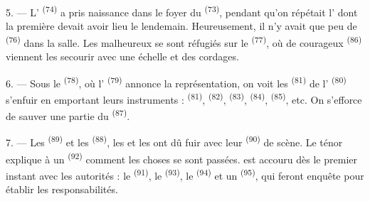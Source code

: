 \VUsaut{5.0mm}
\VUsaut{3.4mm}

5. --- L' \textsuperscript{(74)} a pris naissance dans le foyer
du  \textsuperscript{(73)}, pendant qu'on répétait
l' dont la première  devait avoir lieu le
lendemain. Heureusement, il n'y avait que peu de 
\textsuperscript{(76)} dans la salle. Les malheureux se sont réfugiés sur le
 \textsuperscript{(77)}, où de courageux 
\textsuperscript{(86)} viennent les secourir avec une échelle et des cordages.

6. --- Sous le  \textsuperscript{(78)}, où l'
\textsuperscript{(79)} annonce la représentation, on voit les
 \textsuperscript{(81)} de l'
\textsuperscript{(80)} s'enfuir en emportant leurs instruments :
 \textsuperscript{(81)},  \textsuperscript{(82)},
 \textsuperscript{(83)}, 
\textsuperscript{(84)},  \textsuperscript{(85)}, etc. On
s'efforce de sauver une partie du  \textsuperscript{(87)}.

7. --- Les  \textsuperscript{(89)} et les 
\textsuperscript{(88)}, les  et les  ont dû
fuir avec leur  \textsuperscript{(90)} de scène. Le ténor
explique à un  \textsuperscript{(92)} comment les choses se
sont passées.  est accouru dès le premier instant avec les
autorités : le  \textsuperscript{(91)}, le 
\textsuperscript{(93)}, le  \textsuperscript{(94)}
et un  \textsuperscript{(95)}, qui feront enquête pour établir
les responsabilités.
\VUsaut{6.0mm}
\VUfilet{22mm}
